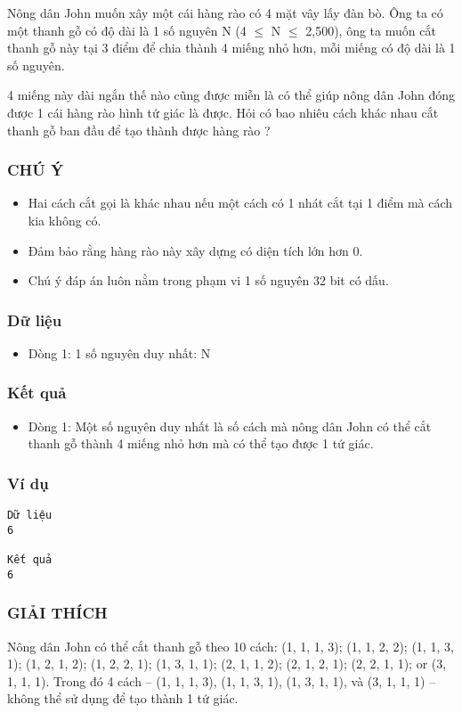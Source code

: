 



   Nông dân John muốn xây một cái hàng rào có 4 mặt vây lấy đàn bò. Ông ta có một thanh gỗ có độ dài là 1 số nguyên N (4  $\le$  N  $\le$  2,500), ông ta muốn cắt thanh gỗ này tại 3 điểm để chia thành 4 miếng nhỏ  hơn, mỗi miếng có độ dài là 1 số nguyên.  

   4 miếng này dài ngắn thế nào cũng được miễn là có thể giúp nông dân John đóng được 1 cái hàng rào hình tứ giác là được. Hỏi có bao nhiêu cách khác nhau cắt thanh gỗ ban đầu để tạo thành được hàng rào ?  

\subsubsection{   CHÚ Ý  }
\begin{itemize}
	\item     Hai cách cắt gọi là khác nhau nếu một cách có 1 nhát cắt tại 1     điểm mà cách kia không có.   
	\item     Đảm bảo rằng hàng rào này xây dựng có diện tích lớn hơn 0.   
	\item     Chú ý đáp án luôn nằm trong phạm vi 1 số nguyên 32 bit có dấu.   
\end{itemize}

\subsubsection{   Dữ liệu  }
\begin{itemize}
	\item     Dòng 1: 1 số nguyên duy nhất: N   
\end{itemize}

\subsubsection{   Kết quả  }
\begin{itemize}
	\item     Dòng 1: Một số nguyên duy nhất là số cách mà nông dân John         có thể cắt thanh gỗ thành 4 miếng nhỏ hơn mà có thể tạo được 1 tứ giác.   
\end{itemize}

\subsubsection{   Ví dụ  }
\begin{verbatim}
Dữ liệu
6

Kết quả
6
\end{verbatim}

\subsubsection{   GIẢI THÍCH  }

   Nông dân John có thể cắt thanh gỗ theo 10 cách: (1, 1, 1, 3); (1, 1, 2, 2); (1, 1, 3, 1); (1, 2, 1, 2); (1, 2, 2, 1); (1, 3, 1, 1); (2, 1, 1, 2); (2, 1, 2, 1); (2, 2, 1, 1); or (3, 1, 1, 1). Trong đó 4 cách -- (1, 1, 1, 3), (1, 1, 3, 1), (1, 3, 1, 1), và (3, 1, 1, 1) -- không thể sử dụng để tạo thành 1 tứ giác.  
